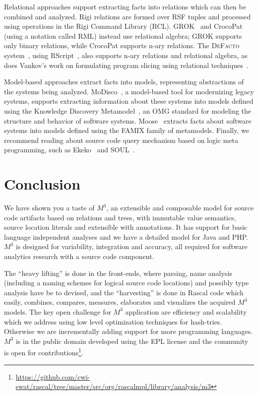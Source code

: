 \documentclass[conference]{IEEEtran}
\newcommand{\Rascal}{\textsc{Rascal}}
\newcommand{\DeFacto}{\textsc{DeFacto}\xspace}
\newcommand{\mthree}{\ensuremath{M^3}\xspace}
\begin{document}
Relational approaches support extracting facts into relations which can then
be combined and analyzed. Rigi relations are formed over RSF tuples and
processed using operations in the Rigi Command Library (RCL).
GROK~\cite{Holt96} and CrocoPat~\cite{BeyerEtAl03,beyer05efficient} (using a
notation called RML) instead use relational algebra; GROK supports only binary
relations, while CrocoPat supports n-ary relations. The \DeFacto
system~\cite{DBLP:conf/sle/BastenK08}, using RScript~\cite{KlintRscript}, also
supports n-ary relations and relational algebra, as does Vankov's work on
formulating program slicing using relational techniques~\cite{Vankov05}.

Model-based approaches extract facts into models, representing abstractions of
the systems being analyzed. MoDisco~\cite{DBLP:journals/infsof/BruneliereCDM14,DBLP:conf/kbse/BruneliereCJM10},
a model-based tool for modernizing legacy
systems, supports extracting information about these systems into models
defined using the Knowledge Discovery Metamodel~\cite{omg-kdm}, an OMG
standard for modeling the structure and behavior of software systems. 
Moose~\cite{DBLP:conf/sigsoft/NierstraszDG05,DBLP:journals/sigsoft/Nierstrasz12}
extracts facts about software systems into models defined using the FAMIX
family of metamodels. Finally, we recommend reading about source code query mechanism based on logic meta programming, such as Ekeko~\cite{ekeko} and SOUL~\cite{soul}.

\section{Conclusion}

We have shown you a taste of \mthree, an extensible and composable model for
source code artifacts based on relations and trees, with immutable value
semantics, source location literals and extensible with annotations. It has
support for basic language independent analyses and we have a detailed model
for Java and PHP. \mthree is designed for variability, integration and accuracy, all required for software analytics research with a source code component.

The ``heavy lifting'' is done in the front-ends, where parsing, name analysis (including a naming schemes for logical source code locations) and possibly type analysis have be to devised, and the ``harvesting'' is done in Rascal code which easily, combines, compares, measures, elaborates and visualizes the acquired \mthree models. The key open challenge for \mthree application are efficiency and scalability which we address using low level optimization techniques for hash-tries. Otherwise we are incrementally adding support for more programming languages. \mthree is in the public domain developed using the EPL license and the community is open for contributions\footnote{\url{https://github.com/cwi-swat/rascal/tree/master/src/org/rascalmpl/library/analysis/m3}}.



\end{document}
